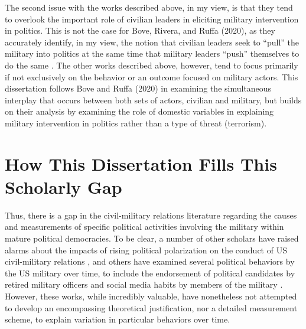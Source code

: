 \documentclass[
  12pt,
  oneside]{memoir}
\begin{document}
The second issue with the works described above, in my view, is that they tend to overlook the important role of civilian leaders in eliciting military intervention in politics. This is not the case for Bove, Rivera, and Ruffa (2020), as they accurately identify, in my view, the notion that civilian leaders seek to ``pull'' the military into politics at the same time that military leaders ``push'' themselves to do the same \autocite{bove_beyond_2020}. The other works described above, however, tend to focus primarily if not exclusively on the behavior or an outcome focused on military actors. This dissertation follows Bove and Ruffa (2020) in examining the simultaneous interplay that occurs between both sets of actors, civilian and military, but builds on their analysis by examining the role of domestic variables in explaining military intervention in politics rather than a type of threat (terrorism).

\hypertarget{how-this-dissertation-fills-this-scholarly-gap}{%
\section{How This Dissertation Fills This Scholarly Gap}\label{how-this-dissertation-fills-this-scholarly-gap}}

Thus, there is a gap in the civil-military relations literature regarding the causes and measurements of specific political activities involving the military within mature political democracies. To be clear, a number of other scholars have raised alarms about the impacts of rising political polarization on the conduct of US civil-military relations \autocites[for example, see][]{robinson_michael_danger_2018,burbach_partisan_2019,feaver_military_2020,feaver_we_2016,barno_how_2016,golby_jim_americas_2020,reid_retired_2020}, and others have examined several political behaviors by the US military over time, to include the endorsement of political candidates by retired military officers and social media habits by members of the military \autocite{griffiths_not_2019,dempsey_our_2010,urben_party_2013,urben_wearing_2014}. However, these works, while incredibly valuable, have nonetheless not attempted to develop an encompassing theoretical justification, nor a detailed measurement scheme, to explain variation in particular behaviors over time.
\end{document}
